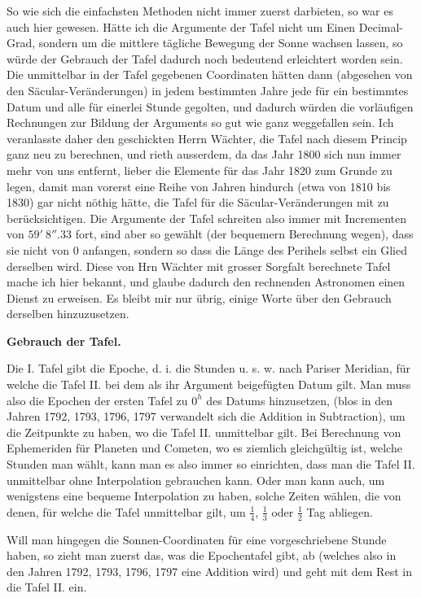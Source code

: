 \documentclass[10pt,a4paper]{article}
\begin{document}
So wie sich die einfachsten Methoden nicht immer zuerst darbieten, so war es auch hier gewesen. Hätte ich die Argumente der Tafel nicht um Einen Decimal-Grad, sondern um die mittlere tägliche Bewegung der Sonne wachsen lassen, so würde der Gebrauch der Tafel dadurch noch bedeutend erleichtert worden sein. Die unmittelbar in der Tafel gegebenen Coordinaten hätten dann (abgesehen von den Säcular-Veränderungen) in jedem bestimmten Jahre jede für ein bestimmtes Datum und alle für einerlei Stunde gegolten, und dadurch würden die vorläufigen Rechnungen zur Bildung der Arguments so gut wie ganz weggefallen sein. Ich veranlasste daher den geschickten Herrn Wächter, die Tafel nach diesem Princip ganz neu zu berechnen, und rieth ausserdem, da das Jahr 1800 sich nun immer mehr von uns entfernt, lieber die Elemente für das Jahr 1820 zum Grunde zu legen, damit man vorerst eine Reihe von Jahren hindurch (etwa von 1810 bis 1830) gar nicht nöthig hätte, die Tafel für die Säcular-Veränderungen mit zu berücksichtigen. Die Argumente der Tafel schreiten also immer mit Incrementen von $59'\ 8''.33$ fort, sind aber so gewählt (der bequemern Berechnung wegen), dass sie nicht von 0 anfangen, sondern so dass die Länge des Perihels selbst ein Glied derselben wird. Diese von Hrn Wächter mit grosser Sorgfalt berechnete Tafel mache ich hier bekannt, und glaube dadurch den rechnenden Astronomen einen Dienst zu erweisen. Es bleibt mir nur übrig, einige Worte über den Gebrauch derselben hinzuzusetzen.

\clearpage
\noindent
\textbf{Gebrauch der Tafel.}

\medskip
\noindent
Die I. Tafel gibt die Epoche, d. i. die Stunden u. s. w. nach Pariser Meridian, für welche die Tafel II. bei dem als ihr Argument beigefügten Datum gilt. Man muss also die Epochen der ersten Tafel zu $0^h$ des Datums hinzusetzen, (blos in den Jahren 1792, 1793, 1796, 1797 verwandelt sich die Addition in Subtraction), um die Zeitpunkte zu haben, wo die Tafel II. unmittelbar gilt. Bei Berechnung von Ephemeriden für Planeten und Cometen, wo es ziemlich gleichgültig ist, welche Stunden man wählt, kann man es also immer so einrichten, dass man die Tafel II. unmittelbar ohne Interpolation gebrauchen kann. Oder man kann auch, um wenigstens eine bequeme Interpolation zu haben, solche Zeiten wählen, die von denen, für welche die Tafel unmittelbar gilt, um $\tfrac{1}{4}$, $\tfrac{1}{3}$ oder $\tfrac{1}{2}$ Tag abliegen.

Will man hingegen die Sonnen-Coordinaten für eine vorgeschriebene Stunde haben, so zieht man zuerst das, was die Epochentafel gibt, ab (welches also in den Jahren 1792, 1793, 1796, 1797 eine Addition wird) und geht mit dem Rest in die Tafel II. ein.
\end{document}
